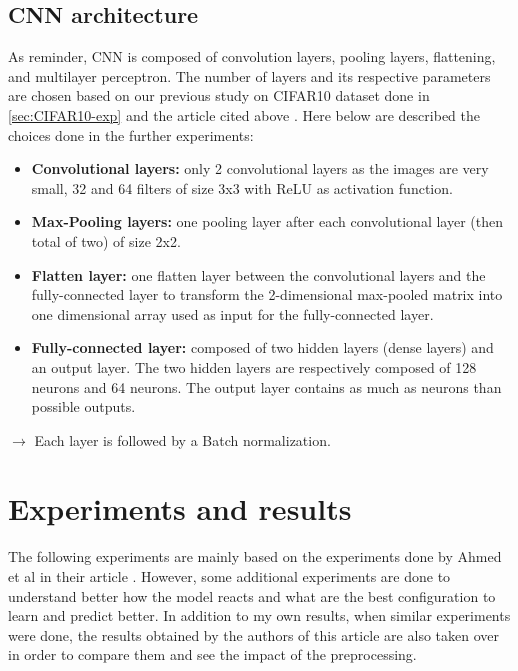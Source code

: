 \documentclass[11pt, openany]{report}
\theoremstyle{plain}
\theoremstyle{definition}
\theoremstyle{remark}
\begin{document}
\newpage
\subsection{CNN architecture}
As reminder, CNN is composed of convolution layers, pooling layers, flattening, and
multilayer perceptron. The number of layers and its respective parameters are chosen based on our previous study on CIFAR10 dataset done in \autoref{sec:CIFAR10-exp} and the article cited above \cite{leukemia}. Here below are described the choices done in the further experiments: 

\begin{itemize}
\item \textbf{Convolutional layers:} only 2 convolutional layers as the images are very small, 32 and 64 filters of size 3x3 with ReLU as activation function.  

\item \textbf{Max-Pooling layers:} one pooling layer after each convolutional layer (then total of two) of size 2x2. 

\item \textbf{Flatten layer:} one flatten layer between the convolutional layers and the fully-connected layer to transform the 2-dimensional max-pooled matrix into one dimensional array used as input for the fully-connected layer. 

\item \textbf{Fully-connected layer:} composed of two hidden layers (dense layers) and an output layer. The two hidden layers are respectively composed of 128 neurons and 64 neurons. The output layer contains as much as neurons than possible outputs.  
\end{itemize}

$\rightarrow$ Each layer is followed by a Batch normalization. 


\section{Experiments and results}

The following experiments are mainly based on the experiments done by Ahmed et al in their article \cite{leukemia}. However, some additional experiments are done to understand better how the model reacts and what are the best configuration to learn and predict better. In addition to my own results, when similar experiments were done, the results obtained by the authors of this article are also taken over in order to compare them and see the impact of the preprocessing. 
\end{document}
